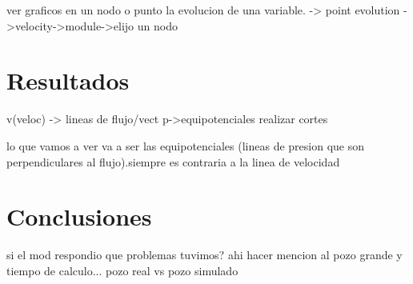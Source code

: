 \documentclass[10pt,a4paper,final]{article}
\begin{document}
ver graficos en un nodo o punto la evolucion de una variable. -> point evolution ->velocity->module->elijo un nodo
\section{Resultados}
v(veloc) -> lineas de flujo/vect
p->equipotenciales
realizar cortes

lo que vamos a ver va a ser las equipotenciales (lineas de presion que son perpendiculares al flujo).siempre es contraria a la linea de velocidad
\section{Conclusiones}
si el mod respondio
que problemas tuvimos? ahi hacer mencion al pozo grande y tiempo de calculo...
pozo real vs pozo simulado
\end{document}
